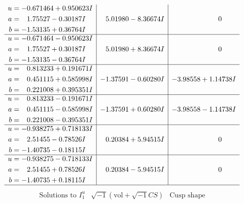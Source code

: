 \documentclass[1p]{elsarticle_modified}
\theoremstyle{definition}
\newcommand{\I}{\sqrt{-1}}
\begin{document}
$$\begin{array}{c|c|c}
\begin{aligned}
u &= -0.671464 + 0.950623 I \\
a &= \phantom{-}1.75527 - 0.30187 I \\
b &= -1.53135 + 0.36764 I\end{aligned}
 & \phantom{-}5.01980 - 8.36674 I & \phantom{-0.000000 } 0 \\ \hline\begin{aligned}
u &= -0.671464 - 0.950623 I \\
a &= \phantom{-}1.75527 + 0.30187 I \\
b &= -1.53135 - 0.36764 I\end{aligned}
 & \phantom{-}5.01980 + 8.36674 I & \phantom{-0.000000 } 0 \\ \hline\begin{aligned}
u &= \phantom{-}0.813233 + 0.191671 I \\
a &= \phantom{-}0.451115 + 0.585998 I \\
b &= \phantom{-}0.221008 + 0.395351 I\end{aligned}
 & -1.37591 - 0.60280 I & -3.98558 + 1.14738 I \\ \hline\begin{aligned}
u &= \phantom{-}0.813233 - 0.191671 I \\
a &= \phantom{-}0.451115 - 0.585998 I \\
b &= \phantom{-}0.221008 - 0.395351 I\end{aligned}
 & -1.37591 + 0.60280 I & -3.98558 - 1.14738 I \\ \hline\begin{aligned}
u &= -0.938275 + 0.718133 I \\
a &= \phantom{-}2.51455 - 0.78526 I \\
b &= -1.40735 - 0.18115 I\end{aligned}
 & \phantom{-}0.20384 + 5.94515 I & \phantom{-0.000000 } 0 \\ \hline\begin{aligned}
u &= -0.938275 - 0.718133 I \\
a &= \phantom{-}2.51455 + 0.78526 I \\
b &= -1.40735 + 0.18115 I\end{aligned}
 & \phantom{-}0.20384 - 5.94515 I & \phantom{-0.000000 } 0\\
 \hline 
 \end{array}$$\newpage$$\begin{array}{c|c|c}  
\text{Solutions to }I^u_{1}& \I (\text{vol} + \sqrt{-1}CS) & \text{Cusp shape}\\
 \hline 
\begin{aligned}

\end{aligned}
\end{array}$$
\end{document}
